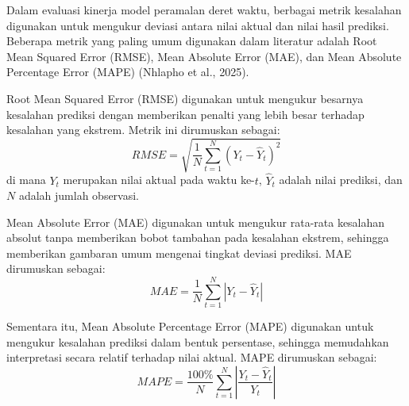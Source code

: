 \noindent Dalam evaluasi kinerja model peramalan deret waktu, berbagai metrik kesalahan digunakan untuk mengukur deviasi antara nilai aktual dan nilai hasil prediksi. Beberapa metrik yang paling umum digunakan dalam literatur adalah Root Mean Squared Error (RMSE), Mean Absolute Error (MAE), dan Mean Absolute Percentage Error (MAPE) (Nhlapho et al., 2025).

Root Mean Squared Error (RMSE) digunakan untuk mengukur besarnya kesalahan prediksi dengan memberikan penalti yang lebih besar terhadap kesalahan yang ekstrem. Metrik ini dirumuskan sebagai:
\begin{equation}
    RMSE = \sqrt{\frac{1}{N} \sum_{t=1}^{N} (Y_t - \hat{Y}_t)^2}
\end{equation}
di mana $Y_t$ merupakan nilai aktual pada waktu ke-$t$, $\hat{Y}_t$ adalah nilai prediksi, dan $N$ adalah jumlah observasi.

Mean Absolute Error (MAE) digunakan untuk mengukur rata-rata kesalahan absolut tanpa memberikan bobot tambahan pada kesalahan ekstrem, sehingga memberikan gambaran umum mengenai tingkat deviasi prediksi. MAE dirumuskan sebagai:
\begin{equation}
    MAE = \frac{1}{N} \sum_{t=1}^{N} |Y_t - \hat{Y}_t|
\end{equation}

Sementara itu, Mean Absolute Percentage Error (MAPE) digunakan untuk mengukur kesalahan prediksi dalam bentuk persentase, sehingga memudahkan interpretasi secara relatif terhadap nilai aktual. MAPE dirumuskan sebagai:
\begin{equation}
    MAPE = \frac{100\%}{N} \sum_{t=1}^{N} \left| \frac{Y_t - \hat{Y}_t}{Y_t} \right|
\end{equation}

\pagebreak
